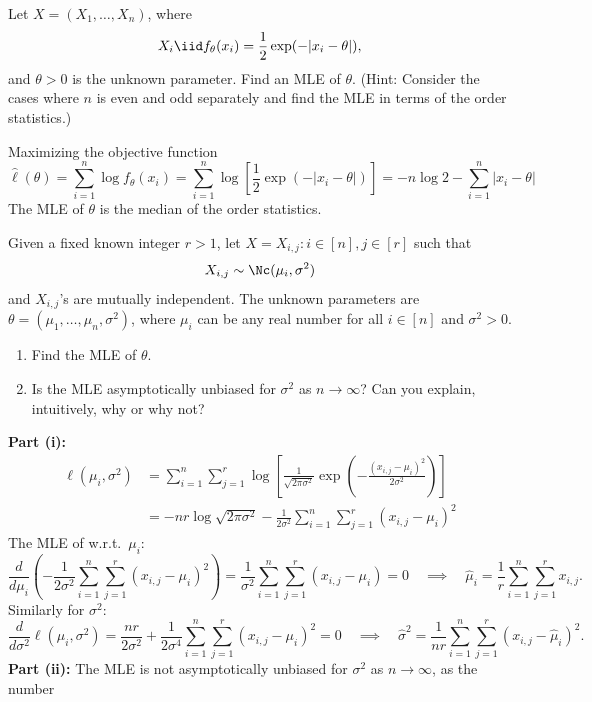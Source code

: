 \documentclass{article}
\begin{document}
\begin{homeworkProblem}
  Let $X = (X_1, \ldots, X_n)$, where
  \[
    X_i \iid f_\theta(x_i) = \frac{1}{2} \exp(-|x_i - \theta|),
  \]
  and $\theta > 0$ is the unknown parameter. Find an MLE of $\theta$. (Hint: Consider the cases where $n$
  is even and odd separately and find the MLE in terms of the order statistics.) \\

  \solution

  Maximizing the objective function
  \[
    \hat{\ell}(\theta) = \sum_{i=1}^n \log f_\theta(x_i) = \sum_{i=1}^n \log \left[ \frac{1}{2} \exp(-|x_i - \theta|) \right] = -n \log 2 - \sum_{i=1}^n |x_i - \theta|
  \]
  The MLE of $\theta$ is the median of the order statistics.



\end{homeworkProblem}

\pagebreak

\begin{homeworkProblem}
  Given a fixed known integer $r > 1$, let $X = X_{i, j} : i \in [n], j \in [r]$ such that
  \[
    X_{i, j} \sim \Nc(\mu_i, \sigma^2)
  \]
  and $X_{i, j}$’s are mutually independent. The unknown parameters are $\theta = (\mu_1, \ldots, \mu_n, \sigma^2)$, where
  $\mu_i$ can be any real number for all $i \in [n]$ and $\sigma^2 > 0$.
  \begin{enumerate}[label=(\roman*), topsep=5pt, itemsep=5pt]
    \item Find the MLE of $\theta$.
    \item Is the MLE asymptotically unbiased for $\sigma^2$ as $n \to \infty$? Can you explain, intuitively, why or why not? \newline
  \end{enumerate}

  \solution

  \textbf{Part (i):}
  \begin{align*}
    \ell(\mu_i, \sigma^2) & = \sum_{i=1}^n \sum_{j=1}^r \log \left[ \frac{1}{\sqrt{2\pi \sigma^2}} \exp\left( -\frac{(x_{i,j} - \mu_i)^2}{2\sigma^2} \right) \right] \\
                          & = -nr \log \sqrt{2\pi\sigma^2} - \frac{1}{2\sigma^2} \sum_{i=1}^n \sum_{j=1}^r (x_{i,j} - \mu_i)^2
  \end{align*}
  The MLE of w.r.t.\ $\mu_i$:
  \[
    \frac{d}{d\mu_i} \left( -\frac{1}{2\sigma^2} \sum_{i=1}^n \sum_{j=1}^r (x_{i,j} - \mu_i)^2 \right) = \frac{1}{\sigma^2} \sum_{i=1}^n \sum_{j=1}^r (x_{i,j} - \mu_i) = 0 \quad\implies\quad \hat{\mu}_i = \frac{1}{r} \sum_{i=1}^n \sum_{j=1}^r x_{i,j}.
  \]
  Similarly for $\sigma^2$:
  \[
    \frac{d}{d\sigma^2} \ell(\mu_i, \sigma^2) = \frac{nr}{2\sigma^2} + \frac{1}{2\sigma^4} \sum_{i=1}^n \sum_{j=1}^r (x_{i,j} - \mu_i)^2 = 0 \quad\implies\quad \hat{\sigma}^2 = \frac{1}{nr} \sum_{i=1}^n \sum_{j=1}^r (x_{i,j} - \hat{\mu}_i)^2.
  \]
  \textbf{Part (ii):}
  The MLE is not asymptotically unbiased for $\sigma^2$ as $n \to \infty$, as the number

\end{homeworkProblem}
\end{document}
